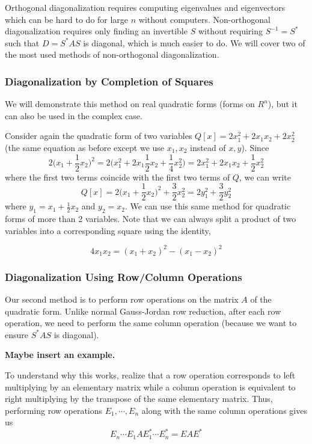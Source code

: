 Orthogonal diagonalization requires computing eigenvalues and eigenvectors which can be hard to do for large $n$ without computers. Non-orthogonal diagonalization requires only finding an invertible $S$ without requiring $S^{-1} = S^{*}$ such that $D = S^{*}AS$ is diagonal, which is much easier to do. We will cover two of the most used methods of non-orthogonal diagonalization. 

\subsubsection{Diagonalization by Completion of Squares} 

We will demonstrate this method on real quadratic forms (forms on $
R^{n}$), but it can also be used in the complex case. 

Consider again the quadratic form of two variables $Q[x] = 2x_{1}^{2} + 2x_{1} x_{2} + 2x_{2}^{2}$ (the same equation as before except we use $x_{1}, x_{2}$ instead of $x, y$). Since 
$$2 \Big( x_{1} + \frac{1}{2} x_{2} \Big)^{2} = 2 \Big( x_{1}^{2} + 2 x_{1} \frac{1}{2} x_{2} + \frac{1}{4} x_{2}^{2} \Big) = 2x_{1}^{2} + 2x_{1}x_{2} + \frac{1}{2} x_{2}^{2}$$
where the first two terms coincide with the first two terms of $Q$, we can write 
$$Q[x] = 2 \Big( x_{1} + \frac{1}{2} x_{2} \Big)^{2} + \frac{3}{2} x_{2}^{2} = 2y_{1}^{2} + \frac{3}{2} y_{2}^{2}$$
where $y_{1} = x_{1} + \frac{1}{2} x_{2}$ and $y_{2} = x_{2}$. We can use this same method for quadratic forms of more than 2 variables. Note that we can always split a product of two variables into a corresponding square using the identity, 

$$4 x_{1} x_{2} = (x_{1} + x_{2})^{2} - (x_{1} - x_{2})^{2}$$

\subsubsection{Diagonalization Using Row/Column Operations}

Our second method is to perform row operations on the matrix $A$ of the quadratic form. Unlike normal Gauss-Jordan row reduction, after each row operation, we need to perform the same column operation (because we want to ensure $S^{*} AS$ is diagonal). 

\textbf{Maybe insert an example. }

To understand why this works, realize that a row operation corresponds to left multiplying by an elementary matrix while a column operation is equivalent to right multiplying by the transpose of the same elementary matrix. Thus, performing row operations $E_{1}, \cdots, E_{n}$ along with the same column operations gives us 
$$E_{n} \cdots E_{1} A E_{1}^{*} \cdots E_{n}^{*} = EAE^{*}$$

